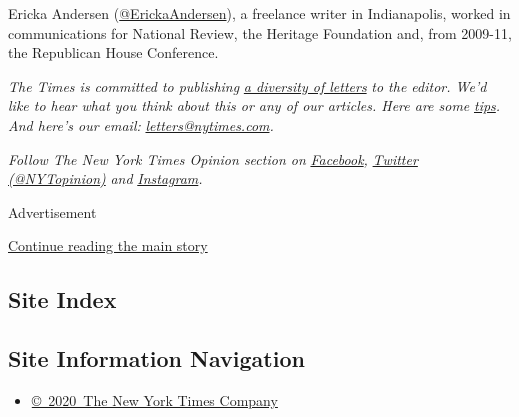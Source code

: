 Ericka Andersen
(\href{https://twitter.com/ErickaAndersen?ref_src=twsrc\%5Egoogle\%7Ctwcamp\%5Eserp\%7Ctwgr\%5Eauthor}{@ErickaAndersen}),
a freelance writer in Indianapolis, worked in communications for
National Review, the Heritage Foundation and, from 2009-11, the
Republican House Conference.

\emph{The Times is committed to publishing}
\href{https://www.nytimes.com/2019/01/31/opinion/letters/letters-to-editor-new-york-times-women.html}{\emph{a
diversity of letters}} \emph{to the editor. We'd like to hear what you
think about this or any of our articles. Here are some}
\href{https://help.nytimes.com/hc/en-us/articles/115014925288-How-to-submit-a-letter-to-the-editor}{\emph{tips}}\emph{.
And here's our email:}
\href{mailto:letters@nytimes.com}{\emph{letters@nytimes.com}}\emph{.}

\emph{Follow The New York Times Opinion section on}
\href{https://www.facebook.com/nytopinion}{\emph{Facebook}}\emph{,}
\href{http://twitter.com/NYTOpinion}{\emph{Twitter (@NYTopinion)}}
\emph{and}
\href{https://www.instagram.com/nytopinion/}{\emph{Instagram}}\emph{.}

Advertisement

\protect\hyperlink{after-bottom}{Continue reading the main story}

\hypertarget{site-index}{%
\subsection{Site Index}\label{site-index}}

\hypertarget{site-information-navigation}{%
\subsection{Site Information
Navigation}\label{site-information-navigation}}

\begin{itemize}
\tightlist
\item
  \href{https://help.nytimes.com/hc/en-us/articles/115014792127-Copyright-notice}{©~2020~The
  New York Times Company}
\end{itemize}

